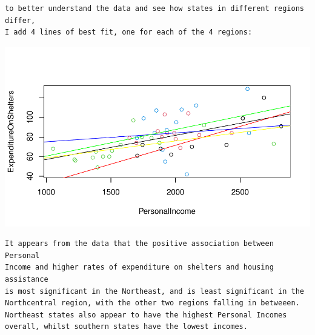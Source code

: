 \documentclass[12pt,letterpaper]{article}
\begin{document}
\begin{itemize}
\begin{verbatim}
to better understand the data and see how states in different regions differ,
I add 4 lines of best fit, one for each of the 4 regions:
\end{verbatim}
 
\includegraphics[width=.75\textwidth]{scatterplot_with_lines}
\begin{verbatim}
It appears from the data that the positive association between Personal
Income and higher rates of expenditure on shelters and housing assistance
is most significant in the Northeast, and is least significant in the
Northcentral region, with the other two regions falling in betweeen.
Northeast states also appear to have the highest Personal Incomes
overall, whilst southern states have the lowest incomes.
\end{verbatim}
	\end{itemize}
	
	
\end{document}
